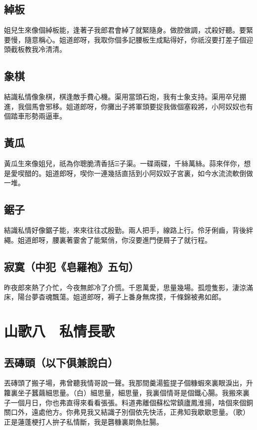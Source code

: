\subsection*{綽板}

姐兒生來像個綽板能，逢著子我郎君會綽了就緊隨身。做腔做調，忒殺好聽。要緊要慢，隨意稱心。姐道郎呀，我取你個多記腰板生成點得好，你祇沒要打差子個迎頭截板教我冷清清。

\subsection*{象棋}

結識私情像象棋，棋逢敵手費心機。渠用當頭石炮，我有士象支持。渠用卒兒掤進，我個馬會邪移。姐道郎呀，你攤出子將軍頭要捉我做個塞殺將，小阿奴奴也有個踏車形勢兩逼車。

\subsection*{黃瓜}

黃瓜生來像姐兒，祇為你聰脆清香括Ξ子渠。一碟兩碟，千絲萬絲。蒜來伴你，想是愛喫醋的。姐道郎呀，喫你一連幾括直括到小阿奴奴子宮裏，如今水流流軟倒做一堆。

\subsection*{鋸子}

結識私情好像鋸子能，來來往往忒殷勤。兩人把手，線路上行。伶牙俐齒，背後絆繩。姐道郎呀，腰裏著霎舍了能緊俏，你沒要進門便屑子了就行程。

\subsection*{寂寞（中犯《皂羅袍》五句）}

昨夜郎來熱了介忙，今夜無郎冷了介慌。千恩萬愛，思量幾場。孤燈隻影，淒涼滿床，陽台夢杳魂飄蕩。姐道郎呀，褥子上番身無席摸，千條錦被弗如郎。


\section*{山歌八　私情長歌}
\subsection*{丟磚頭（以下俱兼說白）}

丟磚頭了搬子場，弗曾聽我情哥說一聲。我那間羹湯籃提子個糠蝦來裏眼淚出，升籮裏坐子蠶繭細思量。（白）細思量，細思量，我裏個情哥是個鐵心腸。我搬來裏子一個月日，你也弗直得來看看張張。料道弗離個蘇松常鎮廬鳳淮揚，啥個來個銅關口外，遠處他方。你弗見我又結識子別個依先快活，正弗知我歇歇思量。（歌）正是蓮蓬梗打人拚子私情斷，我是礱糠裏㓾魚肚腸。

